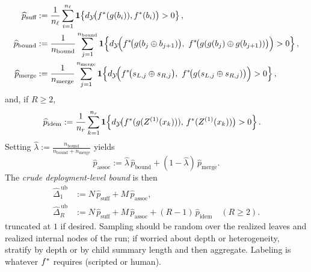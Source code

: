 \begin{align*}
\widehat p_{\text{suff}} &:= \frac{1}{n_\ell}\sum_{i=1}^{n_\ell}\mathbf{1}\!\left\{\metric\!\big(\fstar(g(b_i)),\fstar(b_i)\big)>0\right\}, \\
\widehat p_{\text{bound}} &:= \frac{1}{n_{\text{bound}}}\sum_{j=1}^{n_{\text{bound}}}\mathbf{1}\!\left\{\metric\!\Big(\fstar\!\big(g(b_{j}\concat b_{j+1})\big),\ \fstar\!\big(g(g(b_{j})\concat g(b_{j+1}))\big)\Big)>0\right\}, \\
\widehat p_{\text{merge}} &:= \frac{1}{n_{\text{merge}}}\sum_{j=1}^{n_{\text{merge}}}\mathbf{1}\!\left\{\metric\!\Big(\fstar\!\big(s_{L,j}\concat s_{R,j}\big),\ \fstar\!\big(g(s_{L,j}\concat s_{R,j})\big)\Big)>0\right\},
\end{align*}
and, if $R\ge2$,
\begin{align*}
\widehat p_{\text{idem}} &:= \frac{1}{n_r}\sum_{k=1}^{n_r}\mathbf{1}\!\left\{d_{\mathcal{Y}}\!\big(f^{\ast}(g(Z^{(1)}(x_k))),\,f^{\ast}(Z^{(1)}(x_k))\big)>0\right\}.
\end{align*}
Setting $\widehat\lambda:=\frac{n_{\text{bound}}}{n_{\text{bound}}+n_{\text{merge}}}$ yields
\[
\widehat p_{\text{assoc}}:=\widehat\lambda\,\widehat p_{\text{bound}} + (1-\widehat\lambda)\,\widehat p_{\text{merge}}.
\]
The \emph{crude deployment-level bound} is then
\begin{align*}
\widehat\Delta_1^{\,\mathrm{ub}} &:= N\,\widehat p_{\text{suff}} + M\,\widehat p_{\text{assoc}}, \\
\widehat\Delta_R^{\,\mathrm{ub}} &:= N\,\widehat p_{\text{suff}} + M\,\widehat p_{\text{assoc}} + (R-1)\,\widehat p_{\text{idem}}\quad(R\ge2).
\end{align*}
truncated at $1$ if desired. Sampling should be random over the realized leaves and realized
internal nodes of the run; if worried about depth or heterogeneity, stratify by depth or by child
summary length and then aggregate. Labeling is whatever $f^{\ast}$ requires (scripted or human).

